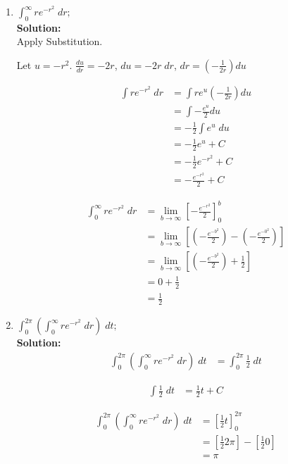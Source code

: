 \documentclass[a4paper]{article}
\begin{document}
\begin{enumerate}
\begin{enumerate}
	\item $\int_0^\infty re^{-r^2} \; dr;$\\
	\textbf{Solution:}\\

Apply Substitution.

Let $u = -r^2$. $\frac{du}{dr} = -2r$, $du = -2r \; dr$, $dr = (- \frac{1}{2r})du$

\begin{align*}
	\int re^{-r^2} \; dr &= \int re^u(-\frac{1}{2r})du\\
	&= \int - \frac{e^u}{2}du\\
	&= -\frac{1}{2} \int e^u \; du\\
	&= -\frac{1}{2} e^u + C\\
	&= -\frac{1}{2}e^{-r^2}+ C\\
	&= -\frac{e^{-r^2}}{2} + C
\end{align*}

\begin{align*}
\int_0^\infty re^{-r^2} \; dr &= \lim_{b \to \infty}\left[ -\frac{e^{-r^2}}{2} \right]_0^b\\
&= \lim_{b \to \infty}\left[ (-\frac{e^{-b^2}}{2}) - (-\frac{e^{-0^2}}{2})\right]\\
&= \lim_{b \to \infty} \left[(-\frac{e^{-b^2}}{2}) + \frac{1}{2} \right]\\
&= 0 + \frac{1}{2}\\
&= \frac{1}{2}
\end{align*}

	
	\item $\int_0^{2\pi} (\int_0^\infty re^{-r^2} \; dr)\; dt;$\\
	\textbf{Solution:}\\

\begin{align*}
	\int_0^{2\pi} (\int_0^\infty re^{-r^2} \; dr)\; dt &= \int_0^{2\pi} \frac{1}{2}\; dt
\end{align*}

\begin{align*}
\int \frac{1}{2}\; dt &= \frac{1}{2}t + C
\end{align*}

\begin{align*}
	\int_0^{2\pi} (\int_0^\infty re^{-r^2} \; dr)\; dt &= \left[ \frac{1}{2}t\right]_0^{2\pi}\\
	&= \left[ \frac{1}{2} 2\pi\right] - \left[ \frac{1}{2}0 \right]\\
	&= \pi
\end{align*}


\end{enumerate}
\end{enumerate}
\end{document}
